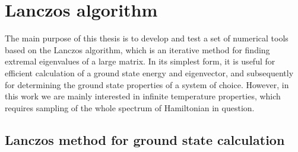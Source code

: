 \chapter{Lanczos algorithm}
\thispagestyle{chapterBeginStyle}

The main purpose of this thesis is to develop and test a set of numerical tools based on the Lanczos algorithm,
which is an iterative method for finding extremal eigenvalues of a large matrix. In its simplest form, it is
useful for efficient calculation of a ground state energy and eigenvector, and subsequently for determining
the ground state properties of a system of choice. However, in this work we are mainly interested in infinite
temperature properties, which requires sampling of the whole spectrum of Hamiltonian in question.

\section{Lanczos method for ground state calculation}